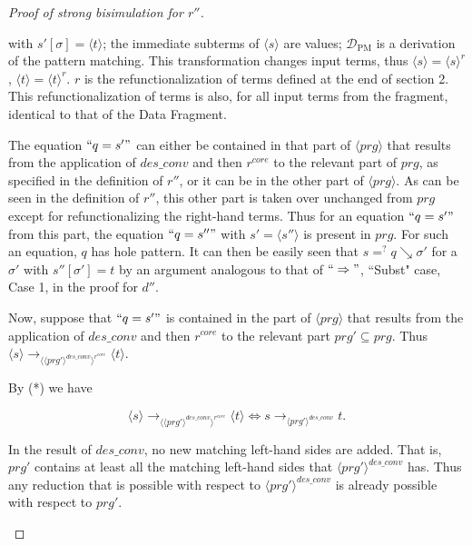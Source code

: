 \documentclass[11pt]{article} %
\begin{document}
\begin{proof}[Proof of strong bisimulation for $r''$]
\begin{enumerate}
\begin{prooftree}
\end{prooftree}

with $s'[\sigma] = \langle t \rangle$; the immediate subterms of $\langle s \rangle$ are values; $\mathcal{D}_{\textrm{PM}}$ is a derivation of the pattern matching. This transformation changes input terms, thus $\langle s \rangle = \langle s \rangle^r$, $\langle t \rangle = \langle t \rangle^r$. $r$ is the refunctionalization of terms defined at the end of section 2. This refunctionalization of terms is also, for all input terms from the fragment, identical to that of the Data Fragment.

The equation $`` q = s' "$ can either be contained in that part of $\langle prg \rangle$ that results from the application of $des\_conv$ and then $r^{core}$ to the relevant part of $prg$, as specified in the definition of $r''$, or it can be in the other part of $\langle prg \rangle$. As can be seen in the definition of $r''$, this other part is taken over unchanged from $prg$ except for refunctionalizing the right-hand terms. Thus for an equation $`` q = s' "$ from this part, the equation $`` q = s'' "$ with $s' = \langle s'' \rangle$ is present in $prg$. For such an equation, $q$ has hole pattern. It can then be easily seen that $s =^? q \searrow \sigma'$ for a $\sigma'$ with $s''[\sigma'] = t$ by an argument analogous to that of $`` \Rightarrow "$, ``Subst" case, Case 1, in the proof for $d''$.

Now, suppose that $`` q = s' "$ is contained in the part of $\langle prg \rangle$ that results from the application of $des\_conv$ and then $r^{core}$ to the relevant part $prg' \subseteq prg$. Thus $\langle s \rangle \longrightarrow_{\langle \langle prg' \rangle^{des\_conv} \rangle^{r^{core}}} \langle t \rangle$.

By (*) we have

\begin{equation*}
\langle s \rangle \longrightarrow_{\langle \langle prg' \rangle^{des\_conv} \rangle^{r^{core}}} \langle t \rangle \iff s \longrightarrow_{\langle prg' \rangle^{des\_conv}} t.
\end{equation*}

In the result of $des\_conv$, no new matching left-hand sides are added. That is, $prg'$ contains at least all the matching left-hand sides that $\langle prg' \rangle^{des\_conv}$ has. Thus any reduction that is possible with respect to $\langle prg' \rangle^{des\_conv}$ is already possible with respect to $prg'$.


\end{enumerate}
\end{proof}
\end{document}
